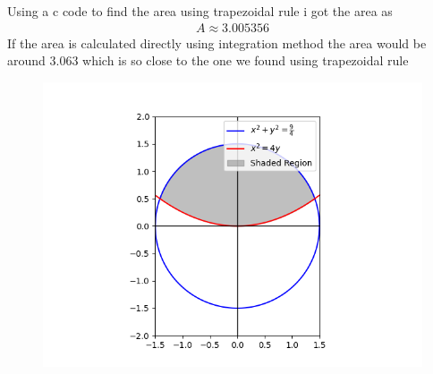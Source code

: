 \documentclass[journal]{IEEEtran}
\numberwithin{equation}{enumi}
\numberwithin{figure}{enumi}
\begin{document}
Using a c code to find the area using trapezoidal rule i got the area as
\begin{align}
    A \approx 3.005356
\end{align}
If the area is calculated directly using integration method the area would be around 3.063 which  is so close to the one we found using trapezoidal rule 
\begin{figure}
	\centering
	\includegraphics[width=\columnwidth]{figs/Figure_1.png}
	\label{stemplot}
\end{figure}	
\end{document}
